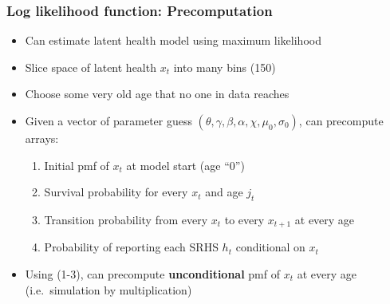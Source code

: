 \documentclass[aspectratio=169]{beamer}
\begin{document}
\begin{frame}\frametitle{Log likelihood function: Precomputation}
\begin{itemize}
	\item <1->Can estimate latent health model using maximum likelihood
	
	\item <2->Slice space of latent health $x_t$ into many bins (150)
	
	\item <2->Choose some very old age that no one in data reaches
	
	\item <3->Given a vector of parameter guess $(\theta, \gamma, \beta, \alpha, \chi, \mu_0,\sigma_0)$, can precompute arrays:
	\begin{enumerate}
		\item <3->Initial pmf of $x_t$ at model start (age ``0'')
		
		\item <4->Survival probability for every $x_t$ and age $j_t$
		
		\item <4->Transition probability from every $x_t$ to every $x_{t+1}$ at every age
		
		\item <5->Probability of reporting each SRHS $h_t$ conditional on $x_t$
	\end{enumerate}

	\item <6->Using (1-3), can precompute \textbf{unconditional} pmf of $x_t$ at every age (i.e.\ simulation by multiplication)
\end{itemize}
\end{frame}
\end{document}
